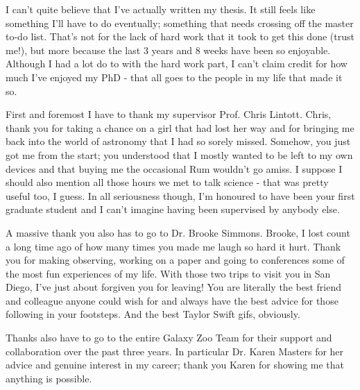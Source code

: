 \documentclass[12pt,useAMS]{ociamthesis}  %
\begin{document}
\begin{acknowledgementslong}


I can't quite believe that I've actually written my thesis. It still feels like something I'll have to do eventually; something that needs crossing off the master to-do list. That's not for the lack of hard work that it took to get this done (trust me!), but more because the last 3 years and 8 weeks have been so enjoyable. Although I had a lot do to with the hard work part, I can't claim credit for how much I've enjoyed my PhD - that all goes to the people in my life that made it so. 

First and foremost I have to thank my supervisor Prof. Chris Lintott. Chris, thank you for taking a chance on a girl that had lost her way and for bringing me back into the world of astronomy that I had so sorely missed. Somehow, you just got me from the start; you understood that I mostly wanted to be left to my own devices and that buying me the occasional Rum wouldn't go amiss. I suppose I should also mention all those hours we met to talk science - that was pretty useful too, I guess. In all seriousness though, I'm honoured to have been your first graduate student and I can't imagine having been supervised by anybody else. 

A massive thank you also has to go to Dr. Brooke Simmons. Brooke, I lost count a long time ago of how many times you made me laugh so hard it hurt. Thank you for making observing, working on a paper and going to conferences some of the most fun experiences of my life. With those two trips to visit you in San Diego, I've just about forgiven you for leaving! You are literally the best friend and colleague anyone could wish for and always have the best advice for those following in your footsteps. And the best Taylor Swift gifs, obviously. 

Thanks also have to go to the entire Galaxy Zoo Team for their support and collaboration over the past three years. In particular Dr. Karen Masters for her advice and genuine interest in my career; thank you Karen for showing me that anything is possible. 


\end{acknowledgementslong}
\end{document}
